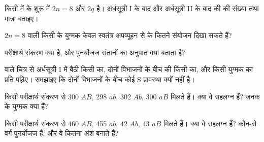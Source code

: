 \begin{exercise}[$\star$]\label{exo:g12:meiosis-genetic-shuffling:3}
किसी  में  के शुरू में $2n = 8$ और  $2q$ है।
अर्धसूत्री I के बाद और अर्धसूत्री II के बाद की  की  संख्या
तथा  मात्रा बताइए।
\end{exercise}

\begin{exercise}[$\star$]\label{exo:g12:meiosis-genetic-shuffling:4}
$2n = 8$ वाली किसी  के युग्मक केवल स्वतंत्र अपव्यूहन से  के
कितने संयोजन दिखा सकते हैं?
\end{exercise}

\begin{exercise}[$\star$]\label{exo:g12:meiosis-genetic-shuffling:5}
परीक्षार्थ संकरण क्या है, और पुनर्योजज संतानों का अनुपात क्या बताता है?
\end{exercise}

\begin{exercise}[$\star\star$]\label{exo:g12:meiosis-genetic-shuffling:6}
 वाले चित्र से अर्धसूत्री I में बैठी किसी  का, दोनों विभाजनों के
बीच की किसी  का, और किसी युग्मक का प्रति   पढ़िए। समझाइए कि
दोनों विभाजनों के बीच कोई S प्रावस्था क्यों नहीं है।
\end{exercise}

\begin{exercise}[$\star\star$]\label{exo:g12:meiosis-genetic-shuffling:7}
किसी परीक्षार्थ संकरण से 300 $AB$, 298 $ab$, 302 $Ab$, 300 $aB$ मिलते हैं।
क्या वे  सहलग्न हैं? जनक के युग्मक क्या हैं?
\end{exercise}

\begin{exercise}[$\star\star$]\label{exo:g12:meiosis-genetic-shuffling:8}
किसी परीक्षार्थ संकरण से 460 $AB$, 455 $ab$, 42 $Ab$, 43 $aB$ मिलते हैं।
क्या वे  सहलग्न हैं? कौन-से वर्ग पुनर्योजज हैं, और वे कितना अंश बनाते हैं?
\end{exercise}

